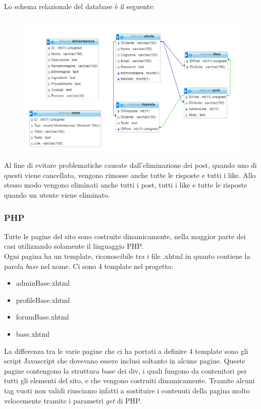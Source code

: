 Lo schema relazionale del database è il seguente: 

\begin{figure}
	\centering
	\includegraphics[width=18cm]{img/database.png}
\end{figure}
\newpage
Al fine di evitare problematiche causate dall'eliminazione dei post, quando uno di questi viene cancellato, vengono rimosse anche tutte le risposte e tutti i like. Allo stesso modo vengono eliminati anche tutti i post, tutti i like e tutte le risposte quando un utente viene eliminato.

\subsubsection{PHP}\label{subs:php}

Tutte le pagine del sito sono costruite dinamicamente, nella maggior parte dei casi utilizzando solamente il linguaggio PHP.\\
Ogni pagina ha un template, riconoscibile tra i file .xhtml in quanto contiene la parola \textit{base} nel nome. Ci sono 4 template nel progetto:

\begin{itemize}
    
	\item adminBase.xhtml
    \item profileBase.xhtml
	\item forumBase.xhtml
	\item base.xhtml
	
\end{itemize}

La differenza tra le varie pagine che ci ha portati a definire 4 template sono gli script Javascript che dovevano essere inclusi soltanto in alcune pagine. Queste pagine contengono la struttura base dei div, i quali fungono da contenitori per tutti gli elementi del sito, e che vengono costruiti dinamicamente. Tramite alcuni tag vuoti non validi riusciamo infatti a sostituire i contenuti della pagina molto velocemente tramite i parametri \textit{get} di PHP.\\

